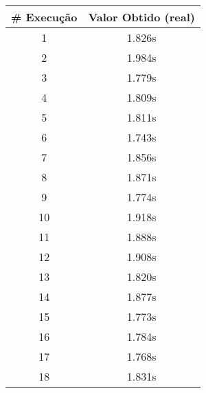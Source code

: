 \documentclass[11pt]{article}
\begin{document}
\begin{table}[!h]
\begin{center}
\begin{minipage}{0.48\textwidth}
\begin{tabular}{| c | c |}
			\hline
				\textbf{\# Execução} &  \textbf{Valor Obtido (real)} \\ \hline
				1 & 1.826s \\ \hline
				2 & 1.984s \\ \hline
				3 & 1.779s \\ \hline
				4 & 1.809s \\ \hline
				5 & 1.811s \\ \hline
				6 & 1.743s \\ \hline
				7 & 1.856s \\ \hline
				8 & 1.871s \\ \hline
				9 & 1.774s \\ \hline
				10 & 1.918s \\ \hline
				11 & 1.888s \\ \hline
				12 & 1.908s \\ \hline
				13 & 1.820s \\ \hline
				14 & 1.877s \\ \hline
				15 & 1.773s \\ \hline
				16 & 1.784s \\ \hline
				17 & 1.768s \\ \hline
				18 & 1.831s \\ \hline
			\end{tabular}
		\end{minipage}
	\end{center}
\end{table}
\end{document}
